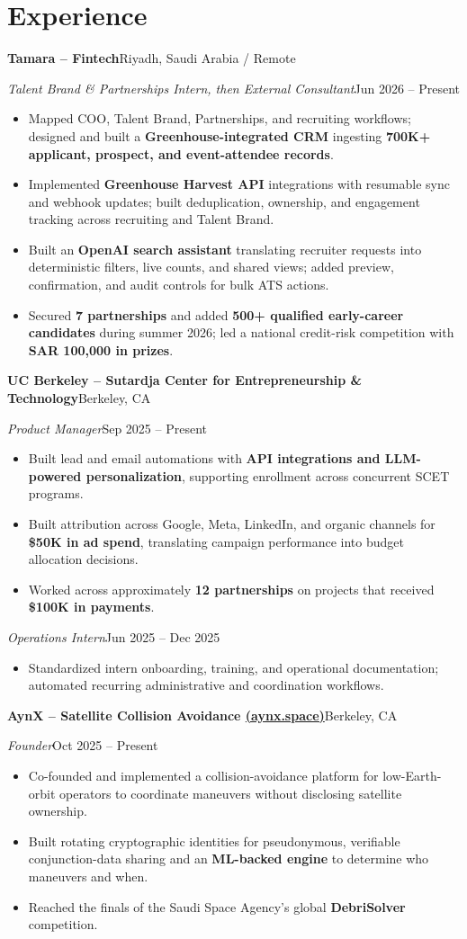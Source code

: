\documentclass[a4paper,10pt]{article}
\newcommand{\entry}[4]{%
  \textbf{#1}\hfill #2\par
  \textit{#3}\hfill #4\par
}
\begin{document}
\section{Experience}
\entry{Tamara -- Fintech}{Riyadh, Saudi Arabia / Remote}
{Talent Brand \& Partnerships Intern, then External Consultant}{Jun 2026 -- Present}
\begin{itemize}
  \item Mapped COO, Talent Brand, Partnerships, and recruiting workflows; designed and built a \textbf{Greenhouse-integrated CRM} ingesting \textbf{700K+ applicant, prospect, and event-attendee records}.
  \item Implemented \textbf{Greenhouse Harvest API} integrations with resumable sync and webhook updates; built deduplication, ownership, and engagement tracking across recruiting and Talent Brand.
  \item Built an \textbf{OpenAI search assistant} translating recruiter requests into deterministic filters, live counts, and shared views; added preview, confirmation, and audit controls for bulk ATS actions.
  \item Secured \textbf{7 partnerships} and added \textbf{500+ qualified early-career candidates} during summer 2026; led a national credit-risk competition with \textbf{SAR 100,000 in prizes}.
\end{itemize}
\entry{UC Berkeley -- Sutardja Center for Entrepreneurship \& Technology}{Berkeley, CA}
{Product Manager}{Sep 2025 -- Present}
\begin{itemize}
  \item Built lead and email automations with \textbf{API integrations and LLM-powered personalization}, supporting enrollment across concurrent SCET programs.
  \item Built attribution across Google, Meta, LinkedIn, and organic channels for \textbf{\$50K in ad spend}, translating campaign performance into budget allocation decisions.
  \item Worked across approximately \textbf{12 partnerships} on projects that received \textbf{\$100K in payments}.
\end{itemize}
\textit{Operations Intern}\hfill Jun 2025 -- Dec 2025\par
\begin{itemize}
  \item Standardized intern onboarding, training, and operational documentation; automated recurring administrative and coordination workflows.
\end{itemize}
\entry{AynX -- Satellite Collision Avoidance \;\href{https://aynx.space}{(aynx.space)}}{Berkeley, CA}
{Founder}{Oct 2025 -- Present}
\begin{itemize}
  \item Co-founded and implemented a collision-avoidance platform for low-Earth-orbit operators to coordinate maneuvers without disclosing satellite ownership.
  \item Built rotating cryptographic identities for pseudonymous, verifiable conjunction-data sharing and an \textbf{ML-backed engine} to determine who maneuvers and when.
  \item Reached the finals of the Saudi Space Agency's global \textbf{DebriSolver} competition.
\end{itemize}
\end{document}
